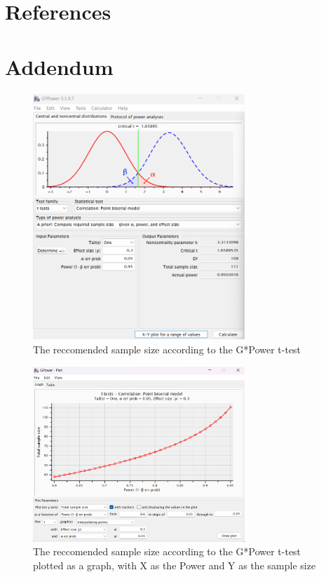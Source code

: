 \documentclass[conference]{IEEEtran}
\begin{document}

\section*{References}





\section {Addendum}
\begin{figure}[H]
\includegraphics[width = 8cm]{fig1(2)}
\caption{The reccomended sample size according to the G*Power t-test}
\end{figure}
\begin{figure}[H]
\includegraphics[width = 8cm]{fig2(2)}
\caption{The reccomended sample size according to the G*Power t-test plotted as a graph, with X as the Power and Y as the sample size}
\end{figure}
\end{document}
